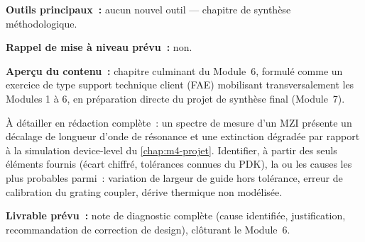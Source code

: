 \noindent\textbf{Outils principaux~:} aucun nouvel outil — chapitre de synthèse méthodologique.

\noindent\textbf{Rappel de mise à niveau prévu~:} non.

\noindent\textbf{Aperçu du contenu~:} chapitre culminant du Module~6, formulé comme un exercice de type support technique client (FAE) mobilisant transversalement les Modules 1 à 6, en préparation directe du projet de synthèse final (Module~7).

\begin{diagnostic}
À détailler en rédaction complète~: un spectre de mesure d'un MZI présente un décalage de longueur d'onde de résonance et une extinction dégradée par rapport à la simulation device-level du \cref{chap:m4-projet}. Identifier, à partir des seuls éléments fournis (écart chiffré, tolérances connues du PDK), la ou les causes les plus probables parmi~: variation de largeur de guide hors tolérance, erreur de calibration du grating coupler, dérive thermique non modélisée.
\end{diagnostic}

\noindent\textbf{Livrable prévu~:} note de diagnostic complète (cause identifiée, justification, recommandation de correction de design), clôturant le Module~6.

